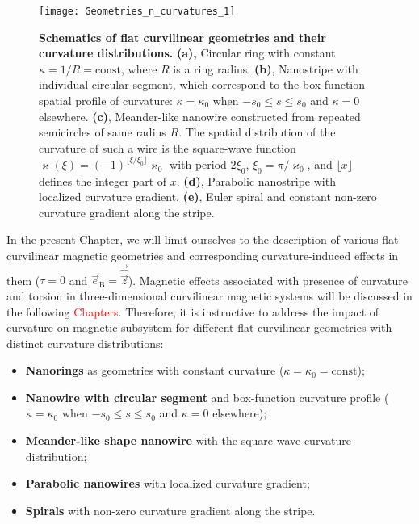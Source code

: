 \begin{figure}[t]
	\texttt{[image: Geometries\_n\_curvatures\_1]}
	\caption{\label{fig:Geometries_n_curvatures}%
		\textbf{Schematics of flat curvilinear geometries and their curvature distributions.} \textbf{(a),} Circular ring with constant $\kappa = 1/R = \textrm{const}$, where $R$ is a ring radius. \textbf{(b)}, Nanostripe with individual circular segment, which correspond to the box-function spatial profile of curvature: $\kappa = \kappa_0$ when $-s_0\leq s \leq s_0$ and $\kappa = 0$ elsewhere. \textbf{(c)}, Meander-like nanowire constructed from repeated semicircles of same radius $R$. The spatial distribution of the curvature of such a wire is the square-wave function $\varkappa(\xi) = (-1)^{\lfloor\xi/\xi_0\rfloor}\varkappa_0$ with period $2\xi_0$, $\xi_0=\pi/\varkappa_0$, and $\lfloor x \rfloor$ defines the integer part of $x$. \textbf{(d)}, Parabolic nanostripe with localized curvature gradient. \textbf{(e)}, Euler spiral and constant non-zero curvature gradient along the stripe. }
\end{figure}

In the present Chapter, we will limit ourselves to the description of various flat curvilinear magnetic geometries and corresponding curvature-induced effects in them ($\tau=0$ and $\vec{e}_\textrm{B} = \vec{\hat{\vec{z}}}$). Magnetic effects associated with presence of curvature and torsion in three-dimensional curvilinear magnetic systems will be discussed in the following \textcolor{red}{Chapters}. Therefore, it is instructive to address the impact of curvature on magnetic subsystem for different flat curvilinear geometries with distinct curvature distributions:
\begin{itemize}
	\item \textbf{Nanorings} as geometries with constant curvature ($\kappa = \kappa_0 = \textrm{const}$);
	\item \textbf{Nanowire with circular segment} and box-function curvature profile ($\kappa = \kappa_0$ when $-s_0\leq s \leq s_0$ and $\kappa = 0$ elsewhere);
	\item \textbf{Meander-like shape nanowire} with the square-wave curvature distribution;
	\item \textbf{Parabolic nanowires} with localized curvature gradient;
	\item \textbf{Spirals} with non-zero curvature gradient along the stripe.
\end{itemize}


